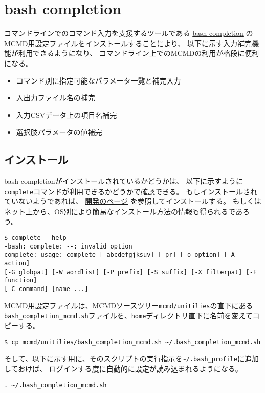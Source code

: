 
%


\section{bash completion\label{sect:whatis}}
コマンドラインでのコマンド入力を支援するツールである
\href{https://github.com/scop/bash-completion}{bash-completion}
のMCMD用設定ファイルをインストールすることにより、
以下に示す入力補完機能が利用できるようになり、
コマンドライン上でのMCMDの利用が格段に便利になる。
\begin{itemize}
\item コマンド別に指定可能なパラメータ一覧と補完入力
\item 入出力ファイル名の補完
\item 入力CSVデータ上の項目名補完
\item 選択肢パラメータの値補完
\end{itemize}

\subsection{インストール\label{sect:bash_comp_install}}
bash-completionがインストールされているかどうかは、
以下に示すように\verb|complete|コマンドが利用できるかどうかで確認できる。
もしインストールされていないようであれば、
\href{https://github.com/scop/bash-completion}{開発のページ}
を参照してインストールする。
もしくはネット上から、OS別により簡易なインストール方法の情報も得られるであろう。

\begin{Verbatim}[baselinestretch=0.7,frame=single]
$ complete --help
-bash: complete: --: invalid option
complete: usage: complete [-abcdefgjksuv] [-pr] [-o option] [-A action]
[-G globpat] [-W wordlist] [-P prefix] [-S suffix] [-X filterpat] [-F function]
[-C command] [name ...]
\end{Verbatim}

MCMD用設定ファイルは、MCMDソースツリー\verb|mcmd/unitilies|の直下にある
\verb|bash_completion_mcmd.sh|ファイルを、\verb|home|ディレクトリ直下に名前を変えてコピーする。

\begin{Verbatim}[baselinestretch=0.7,frame=single]
$ cp mcmd/unitilies/bash_completion_mcmd.sh ~/.bash_completion_mcmd.sh
\end{Verbatim}
そして、以下に示す用に、そのスクリプトの実行指示を\verb|~/.bash_profile|に追加しておけば、
ログインする度に自動的に設定が読み込まれるようになる。
\begin{Verbatim}[baselinestretch=0.7,frame=single]
. ~/.bash_completion_mcmd.sh
\end{Verbatim}

